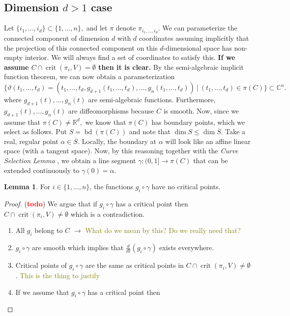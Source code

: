\documentclass[10pt]{article}
\theoremstyle{definition}
\newtheorem{lemma}{Lemma}
\newcommand{\C}{\mathbb{C}}
\newcommand{\R}{\mathbb{R}}
\def\td{(\textcolor{red}{{\bf todo}})}
\def\td{(\textcolor{red}{{\bf todo}}) }
\DeclareMathOperator{\bd}{bd}
\DeclareMathOperator{\crit}{crit}
\begin{document}
\subsection{Dimension $d>1$ case}
Let $\{i_1,\hdots,i_d\} \subset \{1,\hdots,n\},$ and let $\pi$ denote $\pi_{i_1,\hdots,i_d}.$ We can parameterize the connected component of dimension $d$ with $d$ coordinates assuming implicitly that the projection of this connected component on this $d$-dimensional space has non-empty interior. We will always find a set of coordinates to satisfy this. \textbf{If we assume $C \cap \crit(\pi_i,V) = \emptyset$ then it is clear.} By the semi-algebraic implicit function theorem, we can now obtain a parameterization
\[
\big\{\vartheta(t_1,\hdots,t_d) = \left(t_1,\hdots,t_d,g_{d+1}(t_1,\hdots,t_d),\hdots,g_{n}(t_1,\hdots,t_d)\right)~|~ (t_1,\hdots,t_d) \in \pi(C)\big\} \subset \C^n.
\]
where $g_{d+1}(t),\hdots,g_n(t)$ are semi-algebraic functions.  Furthermore, $g_{d+1}(t),\hdots,g_n(t)$ are diffeomorphisms because $C$ is smooth. Now, since we assume that $\pi(C) \not = \R^d,$ we know that $\pi(C)$ has boundary points, which we select as follows. Put $S = \bd\left( \pi(C) \right)$ and note that $\dim S \leq \dim \overline{S}.$ Take a real, regular point $\alpha \in \overline{S}.$ Locally, the boundary at $\alpha$ will look like an affine linear space (with a tangent space). Now, by this reasoning together with the \textit{Curve Selection Lemma} \cite{CurveSelectionLemma},  
we obtain a line segment $\gamma: (0,1] \rightarrow \pi(C)$ that can be extended continuously to $\gamma(0)=\alpha.$ 
%
\begin{lemma}
For $i \in \{1,\hdots,n\}$, the functions $g_i \circ \gamma$ have no critical points. 
\end{lemma}
%
%
\begin{proof}
\td We argue that if $g_i \circ \gamma$ has a critical point then $C \cap \crit(\pi_i,V) \not = \emptyset$ which is a contradiction. 
\begin{enumerate}
    \item All $g_i$ belong to $C$ $\to$ \textcolor{olive}{What do we mean by
        this? Do we really need that?}
    \item $g_i \circ \gamma$ are smooth which implies that $\frac{d}{dt}\left(g_i \circ \gamma \right)$ exists everywhere. 
    \item Critical points of $g_i \circ \gamma$ are the same as critical points
      in $C \cap \crit(\pi_i,V) \not = \emptyset$. \textcolor{olive}{This is the
        thing to justify}
    \item If we assume that $g_i \circ \gamma$ has a critical point then 
\end{enumerate}
\end{proof}
\end{document}
